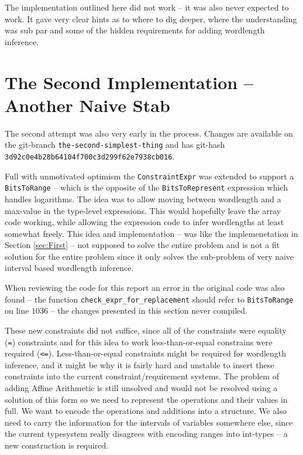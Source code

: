 \documentclass[msc,lith,english]{liuthesis}
\begin{document}
The implementation outlined here did not work -- it was also never expected to work. It gave very clear hints as to where to dig deeper, where the understanding was sub par and some of the hidden requirements for adding wordlength inference.

\section{The Second Implementation -- Another Naive Stab}
\label{sec:Second}
The second attempt was also very early in the process. Changes are available on the git-branch \verb+the-second-simplest-thing+ and has git-hash \verb+3d92c0e4b28b64104f700c3d299f62e7938cb016+.

Full with unmotivated optimism the \verb+ConstraintExpr+ was extended to support a \verb+BitsToRange+ -- which is the opposite of the \verb+BitsToRepresent+ expression which handles logarithms. The idea was to allow moving between wordlength and a max-value in the type-level expressions. This would hopefully leave the array code working, while allowing the expression code to infer wordlengths at least somewhat freely. This idea and implementation -- was like the implemenetation in Section \ref{sec:First} -- not supposed to solve the entire problem and is not a fit solution for the entire problem since it only solves the sub-problem of very naive interval based wordlength inference.

When reviewing the code for this report an error in the original code was also found -- the function \verb+check_expr_for_replacement+ should refer to \verb+BitsToRange+ on line $1036$ -- the changes presented in this section never compiled.

These new constraints did not suffice, since all of the constraints were equality (\verb+=+) constraints and for this idea to work less-than-or-equal constrains were required (\verb+<=+). Less-than-or-equal constraints might be required for wordlength inference, and it might be why it is fairly hard and unstable to insert these constraints into the current constraint/requirement systems. The problem of adding Affine Arithmetic is still unsolved and would not be resolved using a solution of this form so we need to represent the operations and their values in full. We want to encode the operations and additions into a structure. We also need to carry the information for the intervals of variables somewhere else, since the current typesystem really disagrees with encoding ranges into int-types -- a new construction is required. 
\end{document}
